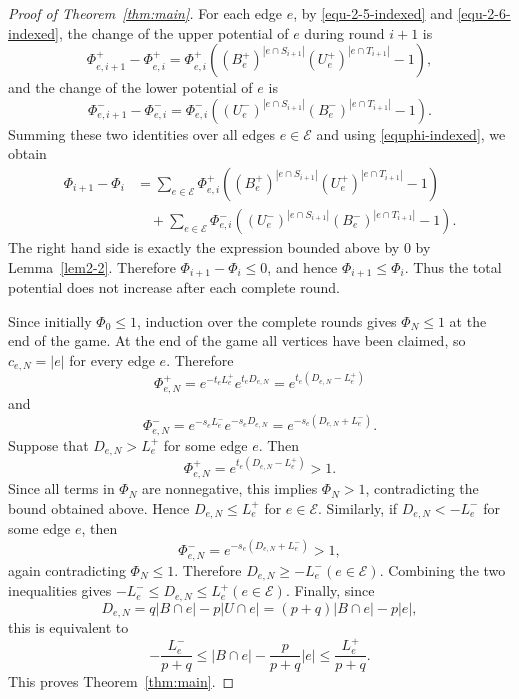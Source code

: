 \documentclass[twoside,12pt]{article}
\numberwithin{equation}{section}
\begin{document}
\begin{proof}[Proof of Theorem~\ref{thm:main}]
For each edge $e$, by \eqref{equ-2-5-indexed} and \eqref{equ-2-6-indexed}, the change of the upper potential of $e$ during round $i+1$ is
\[
        \Phi_{e,i+1}^+-\Phi_{e,i}^+
        =
        \Phi_{e,i}^+
        \left(
        (B_e^+)^{|e\cap S_{i+1}|}
        (U_e^+)^{|e\cap T_{i+1}|}
        -1
        \right),
\]
and the change of the lower potential of $e$ is
\[
        \Phi_{e,i+1}^--\Phi_{e,i}^-
        =
        \Phi_{e,i}^-
        \left(
        (U_e^-)^{|e\cap S_{i+1}|}
        (B_e^-)^{|e\cap T_{i+1}|}
        -1
        \right).
\]
Summing these two identities over all edges $e\in\mathcal E$ and using \eqref{equphi-indexed}, we obtain
\[
\begin{aligned}
        \Phi_{i+1}-\Phi_i
        &=
        \sum_{e\in\mathcal E}
        \Phi_{e,i}^+
        \left(
        (B_e^+)^{|e\cap S_{i+1}|}
        (U_e^+)^{|e\cap T_{i+1}|}
        -1
        \right) \\
        &\quad+
        \sum_{e\in\mathcal E}
        \Phi_{e,i}^-
        \left(
        (U_e^-)^{|e\cap S_{i+1}|}
        (B_e^-)^{|e\cap T_{i+1}|}
        -1
        \right).
\end{aligned}
\]
The right hand side is exactly the expression bounded above by $0$ by Lemma~\ref{lem2-2}.  Therefore
$\Phi_{i+1}-\Phi_i\le0$,
and hence
$\Phi_{i+1}\le\Phi_i$.
Thus the total potential does not increase after each complete round.

Since initially $\Phi_0\le1$, induction over the complete rounds gives
$\Phi_N\le1$
at the end of the game.
At the end of the game all vertices have been claimed, so $c_{e,N}=|e|$ for every edge $e$. Therefore
\[
        \Phi_{e,N}^+=e^{-t_eL_e^+}e^{t_eD_{e,N}}
        =
        e^{t_e(D_{e,N}-L_e^+)}
\]
and
\[
        \Phi_{e,N}^-=e^{-s_eL_e^-}e^{-s_eD_{e,N}}
        =
        e^{-s_e(D_{e,N}+L_e^-)}.
\]
Suppose that $D_{e,N}>L_e^+$ for some edge $e$.  Then
\[
        \Phi_{e,N}^+=e^{t_e(D_{e,N}-L_e^+)}>1.
\]
Since all terms in $\Phi_N$ are nonnegative, this implies $\Phi_N>1$, contradicting the bound obtained above. Hence
        $D_{e,N}\le L_e^+$ for $e\in\mathcal E$.
Similarly, if $D_{e,N}<-L_e^-$ for some edge $e$, then
\[
        \Phi_{e,N}^-=e^{-s_e(D_{e,N}+L_e^-)}>1,
\]
again contradicting $\Phi_N\le1$.  Therefore
$D_{e,N}\ge -L_e^-
        (e\in\mathcal E)$.
Combining the two inequalities gives
$ -L_e^-\le D_{e,N}\le L_e^+
  (e\in\mathcal E)$.
Finally, since
\[
        D_{e,N}=q|B\cap e|-p|U\cap e|=(p+q)|B\cap e|-p|e|,
\]
this is equivalent to
\[
        -\frac{L_e^-}{p+q}
        \le
        |B\cap e|-\frac{p}{p+q}|e|
        \le
        \frac{L_e^+}{p+q}.
\]
This proves Theorem~\ref{thm:main}.
\end{proof}
\end{document}
